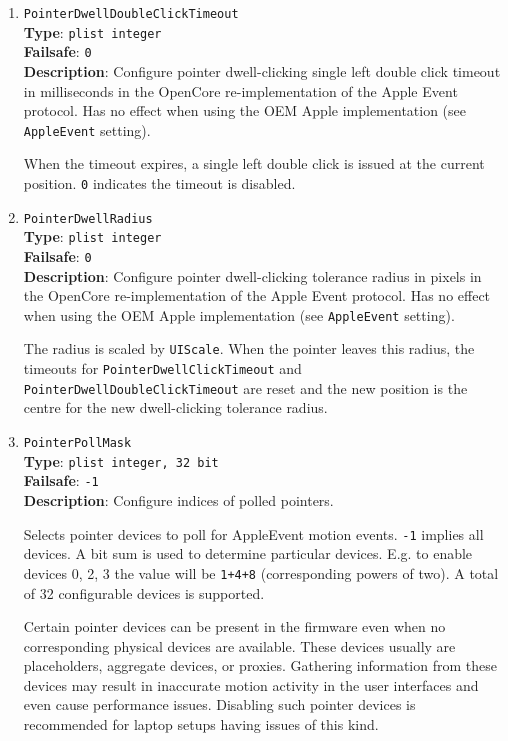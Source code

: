 \documentclass[]{article}
\begin{document}
\begin{enumerate}
  When the timeout expires, a single left click is issued at the current position.
  \texttt{0} indicates the timeout is disabled.

\item
  \texttt{PointerDwellDoubleClickTimeout}\\
  \textbf{Type}: \texttt{plist\ integer}\\
  \textbf{Failsafe}: \texttt{0}\\
  \textbf{Description}: Configure pointer dwell-clicking single left double click timeout in
  milliseconds in the OpenCore re-implementation of the Apple Event protocol.
  Has no effect when using the OEM Apple implementation (see \texttt{AppleEvent} setting).

  When the timeout expires, a single left double click is issued at the current position.
  \texttt{0} indicates the timeout is disabled.

\item
  \texttt{PointerDwellRadius}\\
  \textbf{Type}: \texttt{plist\ integer}\\
  \textbf{Failsafe}: \texttt{0}\\
  \textbf{Description}: Configure pointer dwell-clicking tolerance radius in pixels in the
  OpenCore re-implementation of the Apple Event protocol.
  Has no effect when using the OEM Apple implementation (see \texttt{AppleEvent} setting).

  The radius is scaled by \texttt{UIScale}. When the pointer leaves this radius, the timeouts for \texttt{PointerDwellClickTimeout}
  and \texttt{PointerDwellDoubleClickTimeout} are reset and the new position is the centre
  for the new dwell-clicking tolerance radius.

\item
  \texttt{PointerPollMask}\\
  \textbf{Type}: \texttt{plist\ integer, 32 bit}\\
  \textbf{Failsafe}: \texttt{-1}\\
  \textbf{Description}: Configure indices of polled pointers.

  Selects pointer devices to poll for AppleEvent motion events.
  \texttt{-1} implies all devices. A bit sum is used to determine
  particular devices. E.g. to enable devices 0, 2, 3 the value
  will be \texttt{1+4+8} (corresponding powers of two). A total
  of 32 configurable devices is supported.

  Certain pointer devices can be present in the firmware even when
  no corresponding physical devices are available. These devices
  usually are placeholders, aggregate devices, or proxies.
  Gathering information from these devices may result in inaccurate
  motion activity in the user interfaces and even cause performance
  issues. Disabling such pointer devices is recommended for laptop
  setups having issues of this kind.


\end{enumerate}
\end{document}
